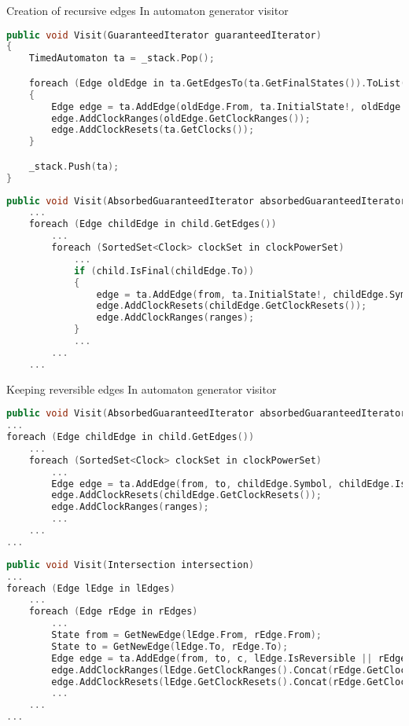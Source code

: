 \begin{frame}[fragile]{Creation of recursive edges}
    In automaton generator visitor
    \begin{lstlisting}[language=c++,basicstyle=\tiny]
public void Visit(GuaranteedIterator guaranteedIterator)
{
    TimedAutomaton ta = _stack.Pop();

    foreach (Edge oldEdge in ta.GetEdgesTo(ta.GetFinalStates()).ToList())
    {
        Edge edge = ta.AddEdge(oldEdge.From, ta.InitialState!, oldEdge.Symbol, true);
        edge.AddClockRanges(oldEdge.GetClockRanges());
        edge.AddClockResets(ta.GetClocks());
    }

    _stack.Push(ta);
}
    \end{lstlisting}
    \begin{lstlisting}[language=c++,basicstyle=\tiny]
public void Visit(AbsorbedGuaranteedIterator absorbedGuaranteedIterator)
    ...
    foreach (Edge childEdge in child.GetEdges())
        ...
        foreach (SortedSet<Clock> clockSet in clockPowerSet)
            ...    
            if (child.IsFinal(childEdge.To))
            {
                edge = ta.AddEdge(from, ta.InitialState!, childEdge.Symbol, true);
                edge.AddClockResets(childEdge.GetClockResets());
                edge.AddClockRanges(ranges);
            }
            ...
        ...
    ...
    \end{lstlisting}
\end{frame}

\begin{frame}[fragile]{Keeping reversible edges}
    In automaton generator visitor
    \begin{lstlisting}[language=c++,basicstyle=\tiny]
public void Visit(AbsorbedGuaranteedIterator absorbedGuaranteedIterator)
...
foreach (Edge childEdge in child.GetEdges())
    ...
    foreach (SortedSet<Clock> clockSet in clockPowerSet)
        ...
        Edge edge = ta.AddEdge(from, to, childEdge.Symbol, childEdge.IsReversible);
        edge.AddClockResets(childEdge.GetClockResets());
        edge.AddClockRanges(ranges);
        ...
    ...
...
    \end{lstlisting}

    \begin{lstlisting}[language=c++,basicstyle=\tiny]
public void Visit(Intersection intersection)
...
foreach (Edge lEdge in lEdges)
    ...
    foreach (Edge rEdge in rEdges)
        ...
        State from = GetNewEdge(lEdge.From, rEdge.From);
        State to = GetNewEdge(lEdge.To, rEdge.To);
        Edge edge = ta.AddEdge(from, to, c, lEdge.IsReversible || rEdge.IsReversible);
        edge.AddClockRanges(lEdge.GetClockRanges().Concat(rEdge.GetClockRanges()));
        edge.AddClockResets(lEdge.GetClockResets().Concat(rEdge.GetClockResets()));
        ...
    ...
...
    \end{lstlisting}
\end{frame}

